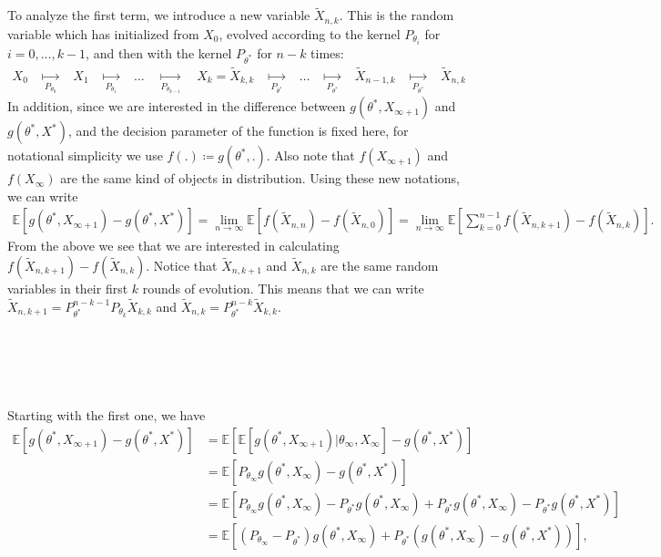 \documentclass[a4paper]{article}
\newcommand{\Exs}{\mathbb{E}}
\newcommand{\thetastar}{\theta^*}
\newcommand{\thetainf}{\theta_\infty}
\newcommand{\xstar}{X^*}
\newcommand{\xinf}{X_{\infty}}
\newcommand{\xinfPone}{X_{\infty + 1}}
\begin{document}
	 To analyze the first term, we introduce a new variable $\tilde{X}_{n, k}$. This is the random variable which has initialized from $X_{0}$, evolved according to the kernel $P_{\theta_{i}}$ for $i = 0, \dots, k - 1$, and then with the kernel $P_{\thetastar}$ for $n - k$ times:
	 \begin{align*}
	 	X_{0} \quad \underset{P_{\theta_{0}}}{\longmapsto}  \quad X_{1} \quad \underset{P_{\theta_{1}}}{\longmapsto} \quad \dots \quad \underset{P_{\theta_{k - 1}}}{\longmapsto} \quad X_{k} = \tilde{X}_{k, k} \quad \underset{P_{\thetastar}}{\longmapsto} \quad \dots \quad \underset{P_{\thetastar}}{\longmapsto} \quad \tilde{X}_{n - 1, k} \quad \underset{P_{\thetastar}}{\longmapsto} \quad \tilde{X}_{n, k}
	 \end{align*}
	 In addition, since we are interested in the difference between $g\left(\thetastar, \xinfPone\right)$ and $g\left(\thetastar, \xstar\right)$, and the decision parameter of the function is fixed here, for notational simplicity we use $f\left( . \right) \coloneq g\left(\thetastar, .\right)$. Also note that $f\left(\xinfPone\right)$ and $f\left(\xinf\right)$ are the same kind of objects in distribution. Using these new notations, we can write
	 \begin{align*}
	 	\Exs\left[g\left(\thetastar, \xinfPone\right) - g\left(\thetastar, \xstar\right)\right] = \lim_{n \to \infty}\Exs\left[f\left(\tilde{X}_{n, n}\right) - f\left(\tilde{X}_{n, 0}\right)\right] = \lim_{n \to \infty}\Exs\left[\sum_{k = 0}^{n - 1}f\left(\tilde{X}_{n, k + 1}\right) - f\left(\tilde{X}_{n, k}\right)\right].
	 \end{align*}
	 From the above we see that we are interested in calculating $f\left(\tilde{X}_{n, k +‌ 1}\right) - f\left(\tilde{X}_{n, k}\right)$. Notice that $\tilde{X}_{n, k +‌ 1}$ and $\tilde{X}_{n, k}$ are the same random variables in their first $k$ rounds of evolution. This means that we can write $\tilde{X}_{n, k + 1} = P_{\thetastar}^{n - k - 1}P_{\theta_{k}}\tilde{X}_{k, k}$ and $\tilde{X}_{n, k} = P_{\thetastar}^{n - k}\tilde{X}_{k, k}$. 
	 \\
	 \\
	 \\
	 \\
	 \\
	 \\	 
	 Starting with the first one, we have 
	 \begin{align*}
	 	\Exs\left[g\left(\thetastar, \xinfPone\right) - g\left(\thetastar, \xstar\right)\right] &= \Exs\left[\Exs\left[g\left(\thetastar, \xinfPone\right) | \thetainf, \xinf\right] - g\left(\thetastar, \xstar\right)\right]\\
	 	&= \Exs\left[P_{\thetainf}g\left(\thetastar, \xinf\right) - g\left(\thetastar, \xstar\right)\right]\\
	 	&= \Exs\left[P_{\thetainf}g\left(\thetastar, \xinf\right) - P_{\thetastar}g\left(\thetastar, \xinf\right) + P_{\thetastar}g\left(\thetastar, \xinf\right) - P_{\thetastar}g\left(\thetastar, \xstar\right)\right]\\
	 	&= \Exs\left[\left(P_{\thetainf} - P_{\thetastar}\right)g\left(\thetastar, \xinf\right) + P_{\thetastar}\left(g\left(\thetastar, \xinf\right) - g\left(\thetastar, \xstar\right)\right)\right],
	 \end{align*}
\end{document}
